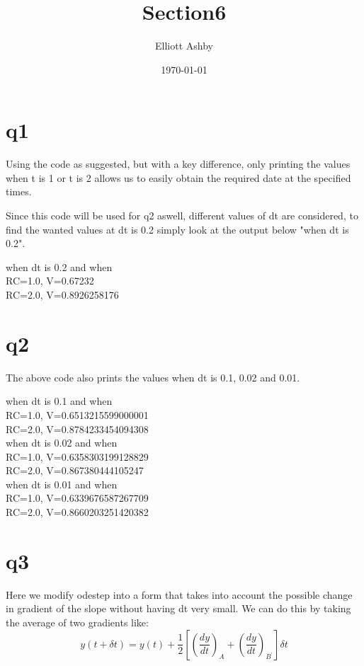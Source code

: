\documentclass[a4paper,english]{article}
\title{Section6}
\author{Elliott Ashby}
\date{\today}
\begin{document}
    \maketitle
    \section{q1}
        Using the code as suggested, but with a key difference, only printing the values when t is 1 
        or t is 2 allows us to easily obtain the required date at the specified times.
        
        Since this code will be used for q2 aswell, different values of dt are considered, to find the wanted values at
        dt is 0.2 simply look at the output below "when dt is 0.2".
        \begin{center}
            when dt is 0.2 and when\\
                RC=1.0, V=0.67232\\
                RC=2.0, V=0.8926258176\\
        \end{center}
    \section{q2}
        The above code also prints the values when dt is 0.1, 0.02 and 0.01.
        \begin{center}
            when dt is 0.1 and when\\
                RC=1.0, V=0.6513215599000001\\
                RC=2.0, V=0.8784233454094308\\
                \medskip
            when dt is 0.02 and when\\
                RC=1.0, V=0.6358303199128829\\
                RC=2.0, V=0.867380444105247\\
                \medskip
            when dt is 0.01 and when\\
                RC=1.0, V=0.6339676587267709\\
                RC=2.0, V=0.8660203251420382\\
        \end{center}
    \section{q3}
      
        Here we modify odestep into a form that takes into account the possible change in gradient of the slope without
        having dt very small. We can do this by taking the average of two gradients like:
        \begin{equation*}
            y(t+\delta t) = y(t) + \frac{1}{2}\left[ \left( \frac{dy}{dt}\right)_{A}+\left( \frac{dy}{dt}\right)_{B^{'}}\right]\delta t
        \end{equation*}
\end{document}
